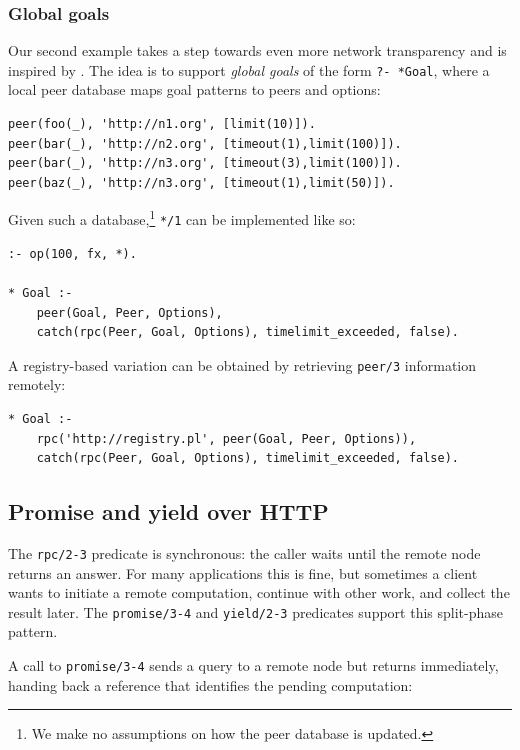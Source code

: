 \subsubsection{Global goals}\label{sec:global-goals}

Our second example takes a step towards even more network transparency and is inspired by \cite{journals/jss/Loke06}. The idea is to support \emph{global goals} of the form \texttt{?- *Goal}, where a local peer database maps goal patterns to peers and options:

\begin{verbatim}
peer(foo(_), 'http://n1.org', [limit(10)]).
peer(bar(_), 'http://n2.org', [timeout(1),limit(100)]).
peer(bar(_), 'http://n3.org', [timeout(3),limit(100)]).
peer(baz(_), 'http://n3.org', [timeout(1),limit(50)]).
\end{verbatim}

\noindent Given such a database,\footnote{We make no assumptions on how the peer database is updated.} \texttt{*/1} can be implemented like so:

\begin{verbatim}
:- op(100, fx, *).

* Goal :-
    peer(Goal, Peer, Options),
    catch(rpc(Peer, Goal, Options), timelimit_exceeded, false).
\end{verbatim}

\noindent A registry-based variation can be obtained by retrieving \texttt{peer/3} information remotely:

\begin{verbatim}
* Goal :-
    rpc('http://registry.pl', peer(Goal, Peer, Options)),
    catch(rpc(Peer, Goal, Options), timelimit_exceeded, false).
\end{verbatim}


\subsection{Promise and yield over HTTP}
\label{sec:promise-yield}

The \texttt{rpc/2-3} predicate is synchronous: the caller waits until the remote node returns an answer. For many applications this is fine, but sometimes a client wants to initiate a remote computation, continue with other work, and collect the result later. The \texttt{promise/3-4} and \texttt{yield/2-3} predicates support this split-phase pattern.

A call to \texttt{promise/3-4} sends a query to a remote node but returns immediately, handing back a reference that identifies the pending computation:

